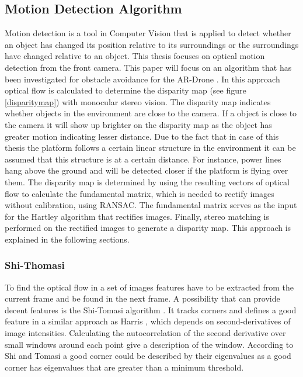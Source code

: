 \documentclass[a4paper]{article}
\begin{document}
\subsection{Motion Detection Algorithm}
\label{MOTION_DETECTION}
Motion detection is a tool in Computer Vision that is applied to detect whether an object has changed its position relative to its surroundings or the surroundings have changed relative to an object. This thesis focuses on optical motion detection from the front camera. This paper will focus on an algorithm that has been investigated for obstacle avoidance for the AR-Drone \cite{Jurriaans2011}. In this approach optical flow is calculated to determine the disparity map (see figure \ref{disparitymap}) with monocular stereo vision. The disparity map indicates whether objects in the environment are close to the camera. If a object is close to the camera it will show up brighter on the disparity map as the object has greater motion indicating lesser distance. Due to the fact that in case of this thesis the platform follows a certain linear structure in the environment it can be assumed that this structure is at a certain distance. For instance, power lines hang above the ground and will be detected closer if the platform is flying over them.
The disparity map is determined by using the resulting vectors of optical flow to calculate the fundamental matrix, which is needed to rectify images without calibration, using RANSAC. The fundamental matrix serves as the input for the Hartley algorithm that rectifies images. Finally, stereo matching is performed on the rectified images to generate a disparity map. This approach is explained in the following sections.

\subsubsection{Shi-Thomasi}
To find the optical flow in a set of images features have to be extracted from the current frame and be found in the next frame. A possibility that can provide decent features is the Shi-Tomasi algorithm \cite{Shi1994}. It tracks corners and defines a good feature in a similar approach as Harris \cite{Harris1988}, which depends on second-derivatives of image intensities. Calculating the autocorrelation of the second derivative over small windows around each point give a description of the window. According to Shi and Tomasi a good corner could be described by their eigenvalues as a good corner has eigenvalues that are greater than a minimum threshold.
\end{document}
